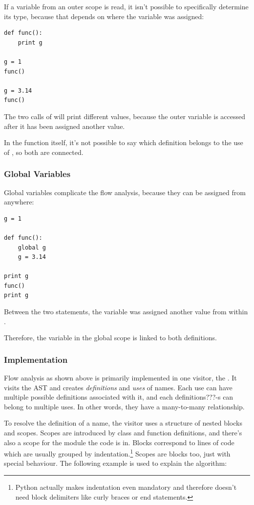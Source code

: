 \documentclass[12pt,halfparskip,DIV11,BCOR10mm]{scrreprt}
\begin{document}
If a variable from an outer scope is read, it isn't possible to specifically determine its type, because that depends on where the variable was assigned:

\begin{lstlisting}
def func():
    print g

g = 1
func()

g = 3.14
func()
\end{lstlisting}

The two calls of  will print different values, because the outer variable  is accessed after it has been assigned another value. 

In the function itself, it's not possible to say which definition belongs to the use of , so both are connected.

\subsubsection{Global Variables}

Global variables complicate the flow analysis, because they can be assigned from anywhere:

\begin{lstlisting}
g = 1

def func():
    global g
    g = 3.14

print g
func()
print g
\end{lstlisting}

Between the two  statements, the variable  was assigned another value from within . 

Therefore, the variable  in the global scope is linked to both definitions.

\subsubsection{Implementation}

Flow analysis as shown above is primarily implemented in one visitor, the . It visits the AST and creates \emph{definitions} and \emph{uses} of names. Each use can have multiple possible definitions associated with it, and each definitions???-s can belong to multiple uses. In other words, they have a many-to-many relationship.

To resolve the definition of a name, the visitor uses a structure of nested blocks and scopes. Scopes are introduced by class and function definitions, and there's also a scope for the module the code is in. Blocks correspond to lines of code which are usually grouped by indentation.\footnote{Python actually makes indentation even mandatory and therefore doesn't need block delimiters like curly braces or end statements.} Scopes are blocks too, just with special behaviour. The following example is used to explain the algorithm:
\end{document}

